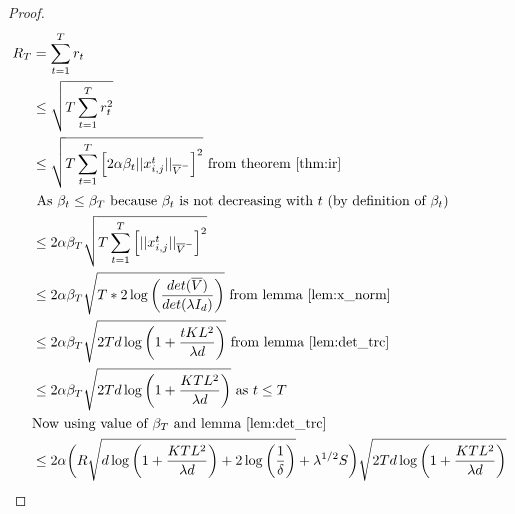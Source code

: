 \begin{proof}
	\begin{align*}
	R_T &= \sum_{t=1}^T r_t \\
	&\le \sqrt{T\sum_{t=1}^T r_t^2} \\
	&\le \sqrt{T\sum_{t=1}^T \left[2\alpha \beta_t||x_{i,j}^t||_{\overline{V}^-}\right]^2} \text{ from theorem~\ref{thm:ir}} \\
	& \text{ As $\beta_t \le \beta_T$ because $\beta_t$ is not decreasing with $t$ (by definition of $\beta_t$)} \\
	&\le 2\alpha \beta_T \sqrt{T\sum_{t=1}^T \left[||x_{i,j}^t||_{\overline{V}^-}\right]^2}  \\
	&\le 2\alpha \beta_T \sqrt{T * 2\log\bigg(\frac{det(\overline{V})}{det(\lambda I_d)}\bigg)} \text{ from lemma~\ref{lem:x_norm}} \\
	&\le 2\alpha \beta_T \sqrt{2Td\log\bigg(1 + \frac{tKL^2}{\lambda d}\bigg)}  \text{ from lemma~\ref{lem:det_trc}} \\
	&\le 2\alpha \beta_T \sqrt{2Td\log\bigg(1 + \frac{KTL^2}{\lambda d}\bigg)}   \text{ as } t \le T \\
	& \text{Now using value of $\beta_T$ and lemma~\ref{lem:det_trc}} \\
	&\le 2\alpha \bigg( R\sqrt{d\log\bigg(1 + \frac{KTL^2}{\lambda d}\bigg) + 2\log\bigg(\frac{1}{\delta}\bigg)} + \lambda^{1/2}S\bigg) \sqrt{2Td\log\bigg(1 + \frac{KTL^2}{\lambda d}\bigg)}
	\end{align*}
\end{proof}
\vspace{-0.8cm}
